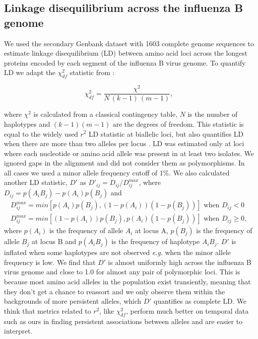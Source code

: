 \documentclass[11pt,oneside,letterpaper]{article}
\newcommand{\chiSq}{\chi^{2}_{df}}
\begin{document}
\subsection*{Linkage disequilibrium across the influenza B genome}
We used the secondary Genbank dataset with 1603 complete genome sequences to estimate linkage disequilibrium (LD) between amino acid loci across the longest proteins encoded by each segment of the influenza B virus genome.
To quantify LD we adapt the $\chiSq$ statistic from \citep{hedrick1986}:

\begin{equation}
\chiSq=\frac{\chi^{2}}{N\,(k-1)\,(m-1)},
\end{equation}

where $\chi^{2}$ is calculated from a classical contingency table, $N$ is the number of haplotypes and $(k-1)(m-1)$ are the degrees of freedom.
This statistic is equal to the widely used $r^2$ LD statistic at biallelic loci, but also quantifies LD when there are more than two alleles per locus \citep{zhao2005}.
LD was estimated only at loci where each nucleotide or amino acid allele was present in at least two isolates.
We ignored gaps in the alignment and did not consider them as polymorphisms.
In all cases we used a minor allele frequency cutoff of 1\%.
We also calculated another LD statistic, $D'$ \citep{lewontin1964} as $D'_{ij}=D_{ij}/D_{ij}^{max}$,
where $D_{ij}=p(A_i B_j) - p(A_i) p(B_j)$ and
\begin{equation}
\begin{split}
D_{ij}^{max}=min[ p(A_i) p(B_j) , (1-p(A_i))(1-p(B_j)) ] \mbox{ when } D_{ij} < 0\\
D_{ij}^{max}=min[ (1-p(A_i)) p(B_j) , p(A_i)(1-p(B_j)) ] \mbox{ when } D_{ij} \geq 0,
\end{split}
\end{equation}
where $p(A_i)$ is the frequency of allele $A_i$ at locus A, $p(B_j)$ is the frequency of allele $B_j$ at locus B and $p(A_i B_j)$ is the frequency of haplotype $A_i B_j$.
$D'$ is inflated when some haplotypes are not observed \textit{e.g.} when the minor allele frequency is low.
We find that $D'$ is almost uniformly high across the influenza B virus genome and close to 1.0 for almost any pair of polymorphic loci.
This is because most amino acid alleles in the population exist transiently, meaning that they don't get a chance to reassort and we only observe them within the backgrounds of more persistent alleles, which $D'$ quantifies as complete LD.
We think that metrics related to $r^2$, like $\chiSq$, perform much better on temporal data such as ours in finding persistent associations between alleles and are easier to interpret.
\end{document}
